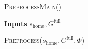 \documentclass[letterpaper]{article} %
\begin{document}

\begin{algorithm}
\caption{\textsc{PreprocessMain()}}\label{alg:1}
\hspace*{\algorithmicindent} \textbf{Inputs} $s_{\textrm{home}}, G^{\textrm{full}}$ \\
\begin{algorithmic}[1]
\State \textsc{Preprocess}($s_{\textrm{home}},G^{\textrm{full}},\Phi$)
\end{algorithmic}
\end{algorithm}
\end{document}
